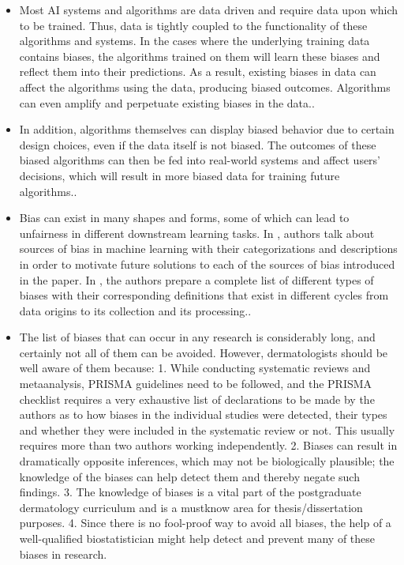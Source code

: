 \documentclass[12pt, a4paper, oneside]{book}   	%
\newif\ifrawcitationactive
\newcommand{\rawcitationend}{\color{black}\rawcitationactivefalse}
\begin{document}
			\begin{itemize}
				\item Most AI systems and algorithms are data driven and require data upon which to be trained. Thus, data is tightly coupled to the functionality of these algorithms and systems. In the cases where the underlying training data contains biases, the algorithms trained on them will learn these biases and reflect them into their predictions. As a result, existing biases in data can affect the algorithms using the data, producing biased outcomes. Algorithms can even amplify and perpetuate existing biases in the data.\autocite{Mehrabi_2021}.
				\item In addition, algorithms themselves can display biased behavior due to certain design choices, even if the data itself is not biased. The outcomes of these biased algorithms can then be fed into real-world systems and affect users’ decisions, which will result in more biased data for training future algorithms.\autocite{Mehrabi_2021}.
				
				\item Bias can exist in many shapes and forms, some of which can lead to unfairness in different downstream learning tasks. In \autocite{M144_Suresh_2021}, authors talk about sources of bias in machine learning with their categorizations and descriptions in order to motivate future solutions to each of the sources of bias introduced in the paper. In \autocite{M120_Olteanu_2019}, the authors prepare a complete list of different types of biases with their corresponding definitions that exist in different cycles from data origins to its collection and its processing.\autocite{Mehrabi_2021}.
			\end{itemize}	
			
			\begin{itemize}
				\item The list of biases that can occur in any research is considerably long, and certainly not all of them can be avoided. However, dermatologists should be well aware of them because: 1. While conducting systematic reviews and metaanalysis, PRISMA guidelines need to be followed, and the PRISMA checklist requires a very exhaustive list of declarations to be made by the authors as to how biases in the individual studies were detected, their types and whether they were included in the systematic review or not. This usually requires more than two authors working independently. 2. Biases can result in dramatically opposite inferences, which may not be biologically plausible; the knowledge of the biases can help detect them and thereby negate such findings. 3. The knowledge of biases is a vital part of the postgraduate dermatology curriculum and is a mustknow area for thesis/dissertation purposes. 4. Since there is no fool-proof way to avoid all biases, the help of a well-qualified biostatistician might help detect and prevent many of these biases in research. \autocite{Chakraborty_2024}
			\end{itemize}
			\rawcitationend
			
\end{document}

